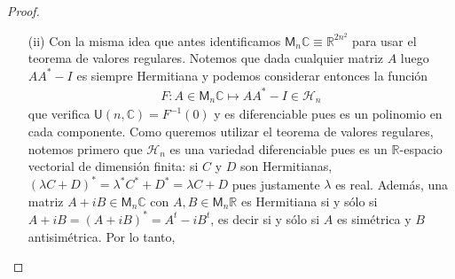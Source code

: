 \documentclass[11pt]{article}
\newcommand{\R}{\mathbb{R}}
\newcommand{\C}{\mathbb{C}}
\newcommand{\M}[2]{\mathsf{M}_{#1}#2}
\newcommand{\nat}[1]{[\![#1]\!]}
\newcommand{\adj}[1]{\operatorname{adj}(#1)}
\begin{document}
\begin{proof}
\begin{itemize}
\begin{align*}
\begin{pmatrix}
R_{11} & R_{12} & \dots & R_{1n} & R_{21} & \dots & R_{nn} & -I_{11} & \dots & -I_{nn} \\
I_{11} & I_{12} & \dots & I_{1n} & I_{21} & \dots & I_{nn} & R_{11} & \dots & R_{nn}
\end{pmatrix}.
\end{align*}
Si $D_A$ no fuera sobreyectivo, entonces o bien $D_A = 0$ o bien $D_A$ es de rango $1$. Veamos que esto \'ultimo (tambi\'en) implica $\adj{A} = 0$. En efecto, si $\operatorname{rg} D_A = 1$ entonces las filas del diferencial son linealmente dependientes y en consecuencia, existe $\lambda \neq 0$ tal que 
\begin{align*}
\begin{cases}
\quad R_{kl} = \lambda I_{kl}\\
- \ I_{kl} = \lambda R_{kl}
\end{cases}
\end{align*}
para cada $k,l \in \nat{n}$. De aqu\'i concluimos que $R_{kl} = - \lambda^2 R_{kl}$ y por lo tanto $R_{kl}(1+\lambda^2) = 0$ as\'i que $R_{kl} = 0$ e $I_{kl} = -\lambda R_{kl} = 0$. Ahora bien, si $A \in \mathsf{SL}(n,\C)$ luego es
\begin{align*}
I = 1 \cdot I = \det(A) I = A \adj{A},
\end{align*}
y no puede ser entonces $\adj{A} = 0$. En consecuencia, $D_A$ siempre es sobreyectivo cuando $A$ es un elemento de $\mathsf{SL}(n,\C)$ y por lo tanto, el teorema de valores regulares nos asegura que esta \'ultima es variedad diferenciable de dimensi\'on $2n^2 - 2 = 2(n^2-1)$.
\item[(ii)] Con la misma idea que antes identificamos $\M{n}{\C} \equiv \R^{2n^2}$ para usar el teorema de valores regulares. Notemos que dada cualquier matriz $A$ luego $AA^* -I$ es siempre Hermitiana y podemos considerar entonces la funci\'on
\begin{align*}
F : A \in \M{n}{\C} \mapsto AA^* -I \in \mathcal{H}_n
\end{align*}
que verifica $\mathsf{U}(n,\C) = F^{-1}(0)$ y es diferenciable pues es un polinomio en cada componente. Como queremos utilizar el teorema de valores regulares, notemos primero que $\mathcal{H}_n$ es una variedad diferenciable pues es un $\R$-espacio vectorial de dimensi\'on finita: si $C$ y $D$ son Hermitianas, $(\lambda C+D)^* = \lambda^*C^*+D^* = \lambda C+D$ pues justamente $\lambda$ es real. Adem\'as, una matriz $A+iB \in \M{n}{\C}$ con $A,B \in \M{n}{\R}$ es Hermitiana si y s\'olo si $A+iB = (A+iB)^* = A^t-iB^t$, es decir si y s\'olo si $A$ es sim\'etrica y $B$ antisim\'etrica. Por lo tanto,

\end{itemize}
\end{proof}
\end{document}
